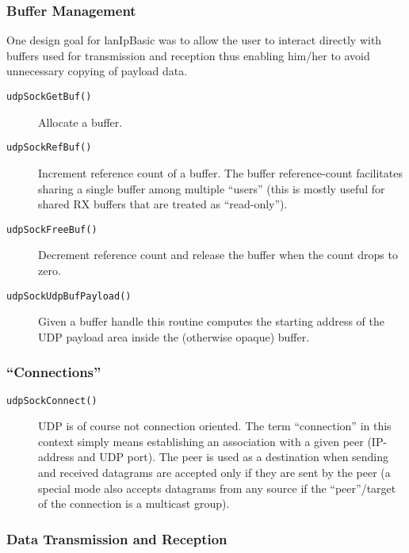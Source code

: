 \documentclass{article}
\newcommand{\lip}{lanIpBasic}
\newcommand{\lipc}[1]{{\tt #1}}
\begin{document}
  \subsubsection{Buffer Management}
  One design goal for \lip{} was to allow the user to interact 
  directly with buffers used for transmission and reception thus
  enabling him/her to avoid unnecessary copying of payload data.
  \begin{description}
  \item[\lipc{udpSockGetBuf()}] Allocate a buffer.
  \item[\lipc{udpSockRefBuf()}] Increment reference count of
  a buffer. The buffer reference-count facilitates sharing
  a single buffer among multiple ``users'' (this is mostly useful
  for shared RX buffers that are treated as ``read-only'').
  \item[\lipc{udpSockFreeBuf()}] Decrement reference count and
  release the buffer when the count drops to zero.
  \item[\lipc{udpSockUdpBufPayload()}] Given a buffer handle
  this routine computes the starting address of the UDP
  payload area inside the (otherwise opaque) buffer.
  \end{description}

  \subsubsection{``Connections''}
  \begin{description}
  \item[\lipc{udpSockConnect()}] UDP is of course not connection
  oriented. The term ``connection'' in this context simply means
  establishing an association with a given peer (IP-address and
  UDP port). The peer is used as a destination when sending
  and received datagrams are accepted only if they are sent
  by the peer (a special mode also accepts datagrams from
  any source if the ``peer''/target of the connection is a
  multicast group).
  \end{description}

  \subsubsection{Data Transmission and Reception}
\end{document}

